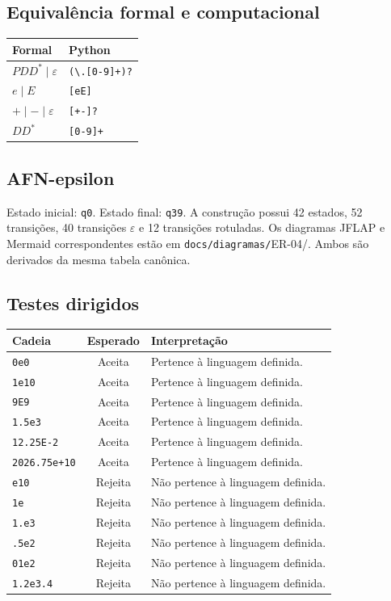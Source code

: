 \documentclass[12pt,a4paper,oneside]{report}
\begin{document}
\subsection{Equivalência formal e computacional}
\begin{center}
\small
\begin{tabular}{|p{}|p{}|}
\toprule
Formal & Python \\
\midrule
$PDD^*\mid\varepsilon$ & \texttt{(\textbackslash.[0-9]+)?} \\
$e\mid E$ & \texttt{[eE]} \\
$+\mid-\mid\varepsilon$ & \texttt{[+-]?} \\
$DD^*$ & \texttt{[0-9]+} \\
\bottomrule
\end{tabular}
\end{center}
\subsection{AFN-epsilon}
Estado inicial: \texttt{q0}. Estado final: \texttt{q39}. A construção possui 42 estados, 52 transições, 40 transições $\varepsilon$ e 12 transições rotuladas.
Os diagramas JFLAP e Mermaid correspondentes estão em \texttt{docs/diagramas/}ER-04/. Ambos são derivados da mesma tabela canônica.
\subsection{Testes dirigidos}
\begin{center}
\small
\begin{tabular}{|p{}|c|p{}|}
\toprule
Cadeia & Esperado & Interpretação \\
\midrule
\texttt{0e0} & Aceita & Pertence à linguagem definida. \\
\texttt{1e10} & Aceita & Pertence à linguagem definida. \\
\texttt{9E9} & Aceita & Pertence à linguagem definida. \\
\texttt{1.5e3} & Aceita & Pertence à linguagem definida. \\
\texttt{12.25E-2} & Aceita & Pertence à linguagem definida. \\
\texttt{2026.75e+10} & Aceita & Pertence à linguagem definida. \\
\texttt{e10} & Rejeita & Não pertence à linguagem definida. \\
\texttt{1e} & Rejeita & Não pertence à linguagem definida. \\
\texttt{1.e3} & Rejeita & Não pertence à linguagem definida. \\
\texttt{.5e2} & Rejeita & Não pertence à linguagem definida. \\
\texttt{01e2} & Rejeita & Não pertence à linguagem definida. \\
\texttt{1.2e3.4} & Rejeita & Não pertence à linguagem definida. \\
\bottomrule
\end{tabular}
\end{center}
\end{document}
